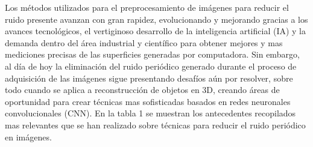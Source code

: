\documentclass[10pt,letterpaper]{article}
\begin{document}
Los métodos utilizados para el preprocesamiento de imágenes para reducir el ruido presente avanzan con gran rapidez, evolucionando y mejorando gracias a los avances tecnológicos, el vertiginoso desarrollo de la inteligencia artificial (IA) y la demanda dentro del área industrial y científico para obtener mejores y mas mediciones precisas  de las superficies generadas por computadora. Sin embargo, al día de hoy la eliminación del ruido periódico generado durante el proceso de adquisición de las imágenes sigue presentando desafíos aún por resolver, sobre todo cuando se aplica a reconstrucción de objetos en 3D, creando áreas de oportunidad para crear técnicas mas sofisticadas basados en redes neuronales convolucionales (CNN). En la tabla 1 se muestran los antecedentes recopilados mas relevantes que se han realizado sobre técnicas para reducir el ruido periódico en imágenes.
\end{document}
